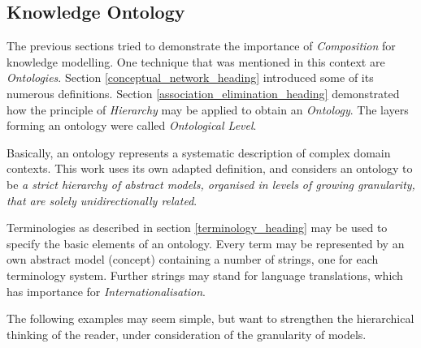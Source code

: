 %
%
%
%
%
%
%

\subsection{Knowledge Ontology}
\label{knowledge_ontology_heading}

The previous sections tried to demonstrate the importance of \emph{Composition}
for knowledge modelling. One technique that was mentioned in this context are
\emph{Ontologies}. Section \ref{conceptual_network_heading} introduced some of
its numerous definitions. Section \ref{association_elimination_heading}
demonstrated how the principle of \emph{Hierarchy} may be applied to obtain an
\emph{Ontology}. The layers forming an ontology were called
\emph{Ontological Level}.

Basically, an ontology represents a systematic description of complex domain
contexts. This work uses its own adapted definition, and considers an ontology
to be \emph{a strict hierarchy of abstract models, organised in levels of
growing granularity, that are solely unidirectionally related}.

Terminologies as described in section \ref{terminology_heading} may be used to
specify the basic elements of an ontology. Every term may be represented by an
own abstract model (concept) containing a number of strings, one for each
terminology system. Further strings may stand for language translations, which
has importance for \emph{Internationalisation}.

The following examples may seem simple, but want to strengthen the hierarchical
thinking of the reader, under consideration of the granularity of models.






